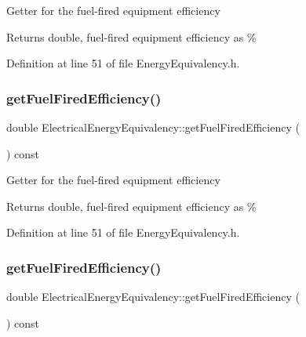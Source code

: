 Getter for the fuel-\/fired equipment efficiency

\begin{DoxyReturn}{Returns}
double, fuel-\/fired equipment efficiency as \% 
\end{DoxyReturn}


Definition at line 51 of file Energy\+Equivalency.\+h.

\mbox{\label{class_electrical_energy_equivalency_adc8def25354f6ba8c3479040507b0ea6}} 
\subsubsection{\texorpdfstring{get\+Fuel\+Fired\+Efficiency()}{getFuelFiredEfficiency()}\hspace{0.1cm}{\footnotesize\ttfamily [2/3]}}
{\footnotesize\ttfamily double Electrical\+Energy\+Equivalency\+::get\+Fuel\+Fired\+Efficiency (\begin{DoxyParamCaption}{ }\end{DoxyParamCaption}) const\hspace{0.3cm}{\ttfamily [inline]}}

Getter for the fuel-\/fired equipment efficiency

\begin{DoxyReturn}{Returns}
double, fuel-\/fired equipment efficiency as \% 
\end{DoxyReturn}


Definition at line 51 of file Energy\+Equivalency.\+h.

\mbox{\label{class_electrical_energy_equivalency_adc8def25354f6ba8c3479040507b0ea6}} 
\subsubsection{\texorpdfstring{get\+Fuel\+Fired\+Efficiency()}{getFuelFiredEfficiency()}\hspace{0.1cm}{\footnotesize\ttfamily [3/3]}}
{\footnotesize\ttfamily double Electrical\+Energy\+Equivalency\+::get\+Fuel\+Fired\+Efficiency (\begin{DoxyParamCaption}{ }\end{DoxyParamCaption}) const\hspace{0.3cm}{\ttfamily [inline]}}


